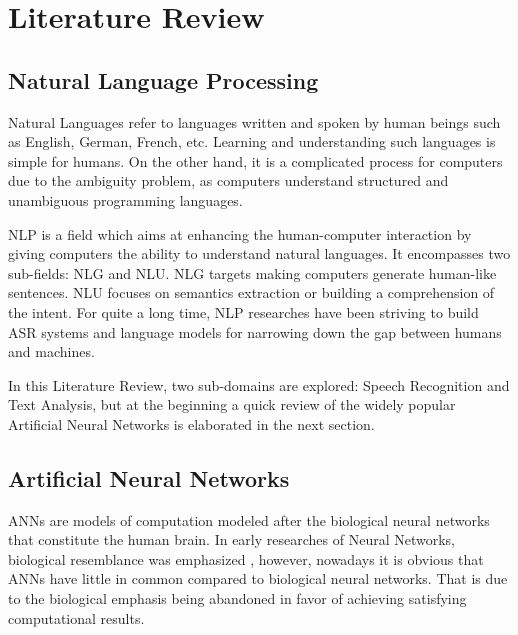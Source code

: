 \chapter{Literature Review}
\label{chap:bg}


\section{Natural Language Processing} 
\label{bg:s1}


Natural Languages refer to languages written and spoken by human beings such as English, German, French, etc. Learning and understanding such languages is simple for humans. On the other hand, it is a complicated process for computers due to the ambiguity problem, as computers understand structured and unambiguous programming languages. 

\ac{NLP} is a field which aims at enhancing the human-computer interaction by giving computers the ability to understand natural languages. It encompasses two sub-fields: \ac{NLG} and \ac{NLU}. \ac{NLG} targets making computers generate human-like sentences. \ac{NLU} focuses on semantics extraction or building a comprehension of the intent. For quite a long time, \ac{NLP} researches have been striving to build \ac{ASR} systems and language models for narrowing down the gap between humans and machines.


In this Literature Review, two sub-domains are explored: Speech Recognition and Text Analysis, but at the beginning a quick review of the widely popular Artificial Neural Networks is elaborated in the next section.


























\section{Artificial Neural Networks} 
\label{bg:s2} 

\ac{ANN}s are models of computation modeled after the biological neural networks that constitute the human brain. 
In early researches of Neural Networks, biological resemblance was emphasized \cite{hopfield1982neural} \cite{jordan1986serial} \cite{elman1990finding}, however, nowadays it is obvious that \ac{ANN}s have little in common compared to biological neural networks. That is due to the biological emphasis being abandoned in favor of achieving satisfying computational results.


